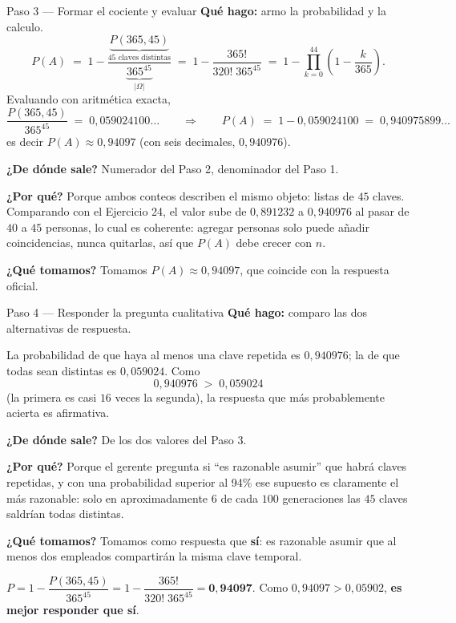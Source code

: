 \documentclass[11pt]{article}
\begin{document}
\begin{sol}
\begin{paso}{Paso 3 --- Formar el cociente y evaluar}
\textbf{Qu\'e hago:} armo la probabilidad y la calculo.
\[
P(A)\;=\;1-\frac{\underbrace{P(365,45)}_{\text{45 claves distintas}}}{\underbrace{365^{45}}_{|\Omega|}}
\;=\;1-\frac{365!}{320!\;365^{45}}
\;=\;1-\prod_{k=0}^{44}\left(1-\frac{k}{365}\right).
\]
Evaluando con aritm\'etica exacta,
\[
\frac{P(365,45)}{365^{45}} \;=\; 0{,}059024100\ldots
\qquad\Longrightarrow\qquad
P(A) \;=\; 1-0{,}059024100 \;=\; 0{,}940975899\ldots
\]
es decir $P(A)\approx 0{,}94097$ (con seis decimales, $0{,}940976$).

\textbf{¿De d\'onde sale?} Numerador del Paso 2, denominador del Paso 1.

\textbf{¿Por qu\'e?} Porque ambos conteos describen el mismo objeto: listas de $45$ claves. Comparando con el Ejercicio 24, el valor sube de $0{,}891232$ a $0{,}940976$ al pasar de $40$ a $45$ personas, lo cual es coherente: agregar personas solo puede a\~nadir coincidencias, nunca quitarlas, as\'i que $P(A)$ debe crecer con $n$.

\textbf{¿Qu\'e tomamos?} Tomamos $P(A)\approx 0{,}94097$, que coincide con la respuesta oficial.
\end{paso}

\begin{paso}{Paso 4 --- Responder la pregunta cualitativa}
\textbf{Qu\'e hago:} comparo las dos alternativas de respuesta.

La probabilidad de que haya al menos una clave repetida es $0{,}940976$; la de que todas sean distintas es $0{,}059024$. Como
\[
0{,}940976 \;>\; 0{,}059024
\]
(la primera es casi $16$ veces la segunda), la respuesta que m\'as probablemente acierta es afirmativa.

\textbf{¿De d\'onde sale?} De los dos valores del Paso 3.

\textbf{¿Por qu\'e?} Porque el gerente pregunta si ``es razonable asumir'' que habr\'a claves repetidas, y con una probabilidad superior al 94\% ese supuesto es claramente el m\'as razonable: solo en aproximadamente $6$ de cada $100$ generaciones las $45$ claves saldr\'ian todas distintas.

\textbf{¿Qu\'e tomamos?} Tomamos como respuesta que \textbf{s\'i}: es razonable asumir que al menos dos empleados compartir\'an la misma clave temporal.
\end{paso}

\end{sol}

\begin{resp}
$P=1-\dfrac{P(365,45)}{365^{45}}=1-\dfrac{365!}{320!\;365^{45}}=\mathbf{0{,}94097}$. Como $0{,}94097>0{,}05902$, \textbf{es mejor responder que s\'i}.
\end{resp}
\end{document}
